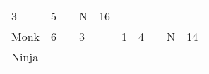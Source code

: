 \documentclass[12pt]{article}
\begin{document}
\begin{longtable}[]{@{}llllllllll@{}}
\begin{minipage}[t]{0.06\columnwidth}\raggedright\strut
3
\strut\end{minipage} &
\begin{minipage}[t]{0.06\columnwidth}\raggedright\strut
5
\strut\end{minipage} &
\begin{minipage}[t]{0.06\columnwidth}\raggedright\strut
\strut\end{minipage} &
\begin{minipage}[t]{0.07\columnwidth}\raggedright\strut
N
\strut\end{minipage} &
\begin{minipage}[t]{0.08\columnwidth}\raggedright\strut
16
\strut\end{minipage}\tabularnewline
\begin{minipage}[t]{0.13\columnwidth}\raggedright\strut
Monk
\strut\end{minipage} &
\begin{minipage}[t]{0.06\columnwidth}\raggedright\strut
6
\strut\end{minipage} &
\begin{minipage}[t]{0.06\columnwidth}\raggedright\strut
\strut\end{minipage} &
\begin{minipage}[t]{0.06\columnwidth}\raggedright\strut
3
\strut\end{minipage} &
\begin{minipage}[t]{0.06\columnwidth}\raggedright\strut
\strut\end{minipage} &
\begin{minipage}[t]{0.06\columnwidth}\raggedright\strut
1
\strut\end{minipage} &
\begin{minipage}[t]{0.06\columnwidth}\raggedright\strut
4
\strut\end{minipage} &
\begin{minipage}[t]{0.06\columnwidth}\raggedright\strut
\strut\end{minipage} &
\begin{minipage}[t]{0.07\columnwidth}\raggedright\strut
N
\strut\end{minipage} &
\begin{minipage}[t]{0.08\columnwidth}\raggedright\strut
14
\strut\end{minipage}\tabularnewline
\begin{minipage}[t]{0.13\columnwidth}\raggedright\strut
Ninja
\strut\end{minipage} &

\end{longtable}
\end{document}
